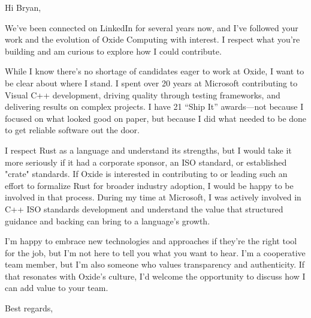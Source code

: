 \documentclass[a4paper,10pt]{letter}
\begin{document}
\begin{letter}{}

\opening{Hi Bryan,}

We’ve been connected on LinkedIn for several years now, and I’ve followed your work and the evolution of Oxide Computing with interest. I respect what you’re building and am curious to explore how I could contribute.

While I know there’s no shortage of candidates eager to work at Oxide, I want to be clear about where I stand. I spent over 20 years at Microsoft contributing to Visual C++ development, driving quality through testing frameworks, and delivering results on complex projects. I have 21 “Ship It” awards—not because I focused on what looked good on paper, but because I did what needed to be done to get reliable software out the door.

I respect Rust as a language and understand its strengths, but I would take it more seriously if it had a corporate sponsor, an ISO standard, or established "crate" standards. If Oxide is interested in contributing to or leading such an effort to formalize Rust for broader industry adoption, I would be happy to be involved in that process. During my time at Microsoft, I was actively involved in C++ ISO standards development and understand the value that structured guidance and backing can bring to a language’s growth.

I’m happy to embrace new technologies and approaches if they’re the right tool for the job, but I’m not here to tell you what you want to hear. I’m a cooperative team member, but I’m also someone who values transparency and authenticity. If that resonates with Oxide’s culture, I’d welcome the opportunity to discuss how I can add value to your team.

\closing{Best regards,}

\end{letter}
\end{document}
